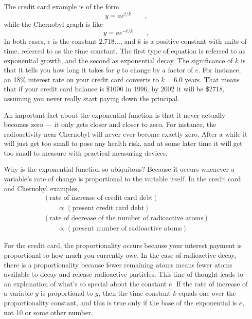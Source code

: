
The credit card example is of the form
\begin{equation*}
    y=ae^{t/k}   \qquad   ,
\end{equation*}
while the Chernobyl graph is like
\begin{equation*}
    y=ae^{-t/k}    \qquad   ,
\end{equation*}
In both cases, $e$ is the constant $2.718\ldots$, and $k$ is a
positive constant with units of time, referred to as the
time constant. The first type of equation is referred to as
exponential growth, and the second as exponential decay. The
significance of $k$ is that it tells you how long it takes
for $y$ to change by a factor of $e$. For instance, an 18\%
interest rate on your credit card converts to $k=6.0$ years.
That means that if your credit card balance is \$1000 in
1996, by 2002 it will be \$2718, assuming you never really
start paying down the principal.

An important fact about the exponential function is that it
never actually becomes zero --- it only gets closer and
closer to zero. For instance, the radioactivity near
Chernobyl will never ever become exactly zero. After a while
it will just get too small to pose any health risk, and at
some later time it will get too small to measure with
practical measuring devices.

Why is the exponential function so ubiquitous? Because it
occurs whenever a variable's rate of change is proportional
to the variable itself. In the credit card and Chernobyl examples,
\begin{gather*}
    (\text{rate of increase of credit card debt}) \\
    \qquad	\propto(\text{present credit card debt})    \\
    (\text{rate of decrease of the number of radioactive atoms}) \\
    \qquad	\propto(\text{present number of radioactive atoms})    
\end{gather*}

For the credit card, the proportionality occurs because your
interest payment is proportional to how much you currently
owe. In the case of radioactive decay, there is a proportionality
because fewer remaining atoms means fewer atoms available to
decay and release radioactive particles. This line of thought
leads to an explanation of what's so special about the
constant $e$. If the rate of increase of a variable $y$ is
proportional to $y$, then the time constant $k$ equals one
over the proportionality constant, and this is true only if
the base of the exponential is $e$, not 10 or some other number.

